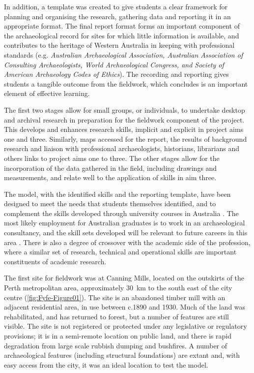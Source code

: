 \documentclass[%
]{ijsra}
\begin{document}
	In addition, a template was created to give students a clear framework for planning and organising the research, gathering data and reporting it in an appropriate format. 
	The final report format forms an important component of the archaeological record for sites for which little information is available, and contributes to the heritage of Western Australia in keeping with professional standards (e.g. \emph{Australian Archaeological Association, Australian Association of Consulting Archaeologists, World Archaeological Congress, and Society of American Archaeology Codes of Ethics}). 
	The recording and reporting gives students a tangible outcome from the fieldwork, which \textcite[113-116]{mytum2012c} concludes is an important element of effective learning.
	
	The first two stages allow for small groups, or individuals, to undertake desktop and archival research in preparation for the fieldwork component of the project. 
	This develops and enhances research skills, implicit and explicit in project aims one and three. Similarly, maps accessed for the report, the results of background research and liaison with professional archaeologists, historians, librarians and others links to project aims one to three. 
	The other stages allow for the incorporation of the data gathered in the field, including drawings and measurements, and relate well to the application of skills in aim three.
	
	The model, with the identified skills and the reporting template, have been designed to meet the needs that students themselves identified, and to complement the skills developed through university courses in Australia \parencite[3]{beck2008}. 
	The most likely employment for Australian graduates is to work in an archaeological consultancy, and the skill sets developed will be relevant to future careers in this area \parencites[e.g.][]{ireland2013}{ulm2005}{ulm2013}. 
	There is also a degree of crossover with the academic side of the profession, where a similar set of research, technical and operational skills are important constituents of academic research.
	
	
	The first site for fieldwork was at Canning Mills, located on the outskirts of the Perth metropolitan area, approximately \SI {30}{\kilo\meter} 
	to the south east of the city centre (\cref{fig:Fyfe-Figure01}). 
	The site is an abandoned timber mill with an adjacent residential area, in use between c.1890 and 1930. 
	Much of the land was rehabilitated, and has returned to forest, but a number of features are still visible. The site is not registered or protected under any legislative or regulatory provisions; it is in a semi-remote location on public land, and there is rapid degradation from large scale rubbish dumping and bushfires. A number of archaeological features (including structural foundations) are extant and, with easy access from the city, it was an ideal location to test the model.
	
\end{document}
